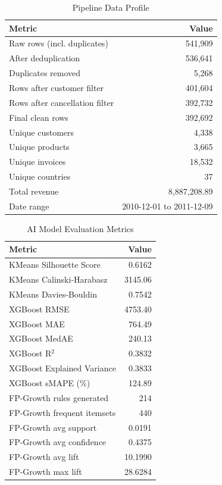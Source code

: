 \begin{table}[H]
\centering
\caption{Pipeline Data Profile}
\smallskip
\begin{tabular}{lr}
\toprule
\textbf{Metric} & \textbf{Value} \\
\midrule
Raw rows (incl. duplicates) & 541,909 \\
After deduplication & 536,641 \\
Duplicates removed & 5,268 \\
Rows after customer filter & 401,604 \\
Rows after cancellation filter & 392,732 \\
Final clean rows & 392,692 \\
Unique customers & 4,338 \\
Unique products & 3,665 \\
Unique invoices & 18,532 \\
Unique countries & 37 \\
Total revenue & 8,887,208.89 \\
Date range & 2010-12-01 to 2011-12-09 \\
\bottomrule
\end{tabular}
\end{table}

\begin{table}[H]
\centering
\caption{AI Model Evaluation Metrics}
\smallskip
\begin{tabular}{lr}
\toprule
\textbf{Metric} & \textbf{Value} \\
\midrule
KMeans Silhouette Score & 0.6162 \\
KMeans Calinski-Harabasz & 3145.06 \\
KMeans Davies-Bouldin & 0.7542 \\
XGBoost RMSE & 4753.40 \\
XGBoost MAE & 764.49 \\
XGBoost MedAE & 240.13 \\
XGBoost R$^2$ & 0.3832 \\
XGBoost Explained Variance & 0.3833 \\
XGBoost sMAPE (\%) & 124.89 \\
FP-Growth rules generated & 214 \\
FP-Growth frequent itemsets & 440 \\
FP-Growth avg support & 0.0191 \\
FP-Growth avg confidence & 0.4375 \\
FP-Growth avg lift & 10.1990 \\
FP-Growth max lift & 28.6284 \\
\bottomrule
\end{tabular}
\end{table}


